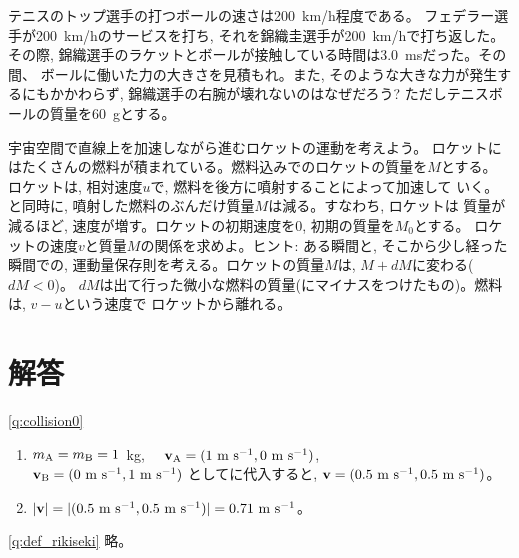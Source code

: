 \begin{exq} テニスのトップ選手の打つボールの速さは200~km/h程度である。
フェデラー選手が200~km/hのサービスを打ち, それを錦織圭選手が200~km/hで打ち返した。
その際, 錦織選手のラケットとボールが接触している時間は3.0~msだった。その間、
ボールに働いた力の大きさを見積もれ。また, そのような大きな力が発生するにもかかわらず, 
錦織選手の右腕が壊れないのはなぜだろう? ただしテニスボールの質量を60~gとする。\end{exq}

\begin{exq} 宇宙空間で直線上を加速しながら進むロケットの運動を考えよう。
ロケットにはたくさんの燃料が積まれている。燃料込みでのロケットの質量を$M$とする。
ロケットは, 相対速度$u$で, 燃料を後方に噴射することによって加速して
いく。と同時に, 噴射した燃料のぶんだけ質量$M$は減る。すなわち, ロケットは
質量が減るほど, 速度が増す。ロケットの初期速度を0, 初期の質量を$M_0$とする。
ロケットの速度$v$と質量$M$の関係を求めよ。ヒント: ある瞬間と, そこから少し経った
瞬間での, 運動量保存則を考える。ロケットの質量$M$は, $M+dM$に変わる($dM<0$)。
$dM$は出て行った微小な燃料の質量(にマイナスをつけたもの)。燃料は, $v-u$という速度で
ロケットから離れる。\end{exq}


\section{解答}
\ref{q:collision0}
\begin{enumerate}
\item $m_{\text A}=m_{\text B}=1$~kg,　
${\bf v}_{\text A}=(1\text{ m s}^{-1}, 0\text{ m s}^{-1})$, \\
${\bf v}_{\text B}=(0\text{ m s}^{-1}, 1\text{ m s}^{-1})$
としてに代入すると, 
${\bf v}=(0.5\text{ m s}^{-1}, 0.5\text{ m s}^{-1})$。
\item $|{\bf v}|=|(0.5\text{ m s}^{-1}, 0.5\text{ m s}^{-1})|=0.71\text{ m s}^{-1}$。
\end{enumerate}

\ref{q:def_rikiseki} 略。
\mv

